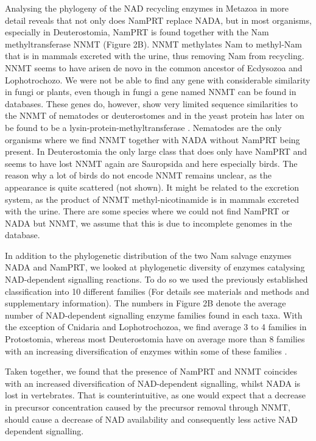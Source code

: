 Analysing the phylogeny of the NAD recycling enzymes in Metazoa in more detail reveals that not only does NamPRT replace NADA, but in most organisms, especially in Deuterostomia, NamPRT is found together with the Nam methyltransferase NNMT (Figure 2B). NNMT methylates Nam to methyl-Nam that is in mammals excreted with the urine, thus removing Nam from recycling. NNMT seems to have arisen de novo in the common ancestor of Ecdysozoa and Lophotrochozo.  We were not be able to find any gene with considerable similarity in fungi or plants, even though in fungi a gene named NNMT can be found in databases. These genes do, however, show very limited sequence similarities to the NNMT of nematodes or deuterostomes and in the yeast protein has later on be found to be a lysin-protein-methyltransferase \cite{Wlodarski2011}. Nematodes are the only organisms where we find NNMT together with NADA without NamPRT being present. In Deuterostomia the only large class that does only have NamPRT and seems to have lost NNMT again are Sauropsida and here especially birds. The reason why a lot of birds do not encode NNMT remains unclear, as the appearance is quite scattered (not shown). It might be related to the excretion system, as the product of NNMT methyl-nicotinamide is in mammals excreted with the urine. There are some species where we could not find NamPRT or NADA but NNMT, we assume that this is due to incomplete genomes in the database.

In addition to the phylogenetic distribution of the two Nam salvage enzymes NADA and NamPRT, we looked at phylogenetic diversity of enzymes catalysing NAD-dependent signalling reactions. To do so we used the previously established classification into 10 different families \cite{Gossmann2012FEBS} (For details see materials and methods and supplementary information). The numbers in Figure 2B denote the average number of NAD-dependent signalling enzyme families found in each taxa. With the exception of Cnidaria and Lophotrochozoa, we find average 3 to 4 families in Protostomia, whereas most Deuterostomia have on average more than 8 families with an increasing diversification of enzymes within some of these families \cite{Gossmann2014DNAR}.

Taken together, we found that the presence of NamPRT and NNMT coincides with an increased diversification of NAD-dependent signalling, whilst NADA is lost in vertebrates. That is  counterintuitive, as one would expect that a decrease in precursor concentration caused by the precursor removal through NNMT, should cause a decrease of NAD availability and consequently less active NAD dependent signalling.



